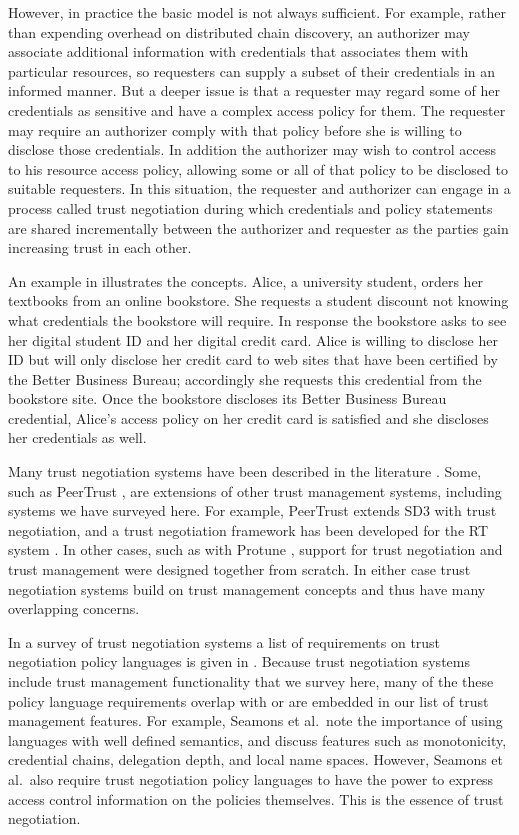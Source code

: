 However, in practice the basic model is not always sufficient.  For
example, rather than expending overhead on distributed chain
discovery, an authorizer may associate additional information with
credentials that associates them with particular resources, so
requesters can supply a subset of their credentials in an informed
manner.  But a deeper issue is that a requester may regard some of her
credentials as sensitive and have a complex access policy for
them. The requester may require an authorizer comply with that policy
before she is willing to disclose those credentials.  In addition the
authorizer may wish to control access to his resource access policy,
allowing some or all of that policy to be disclosed to suitable
requesters. In this situation, the requester and authorizer can engage
in a process called trust negotiation during which
credentials and policy statements are shared incrementally between the
authorizer and requester as the parties gain increasing trust in each
other.

An example in \cite{seamons-policy02} illustrates the concepts. Alice, a
university student, orders her textbooks from an online bookstore. She
requests a student discount not knowing what credentials the bookstore will
require. In response the bookstore asks to see her digital student ID and her
digital credit card. Alice is willing to disclose her ID but will only
disclose her credit card to web sites that have been certified by the Better
Business Bureau; accordingly she requests this credential from the bookstore
site. Once the bookstore discloses its Better Business Bureau credential,
Alice's access policy on her credit card is satisfied and she discloses her
credentials as well.

Many trust negotiation systems have been described in the literature
\cite{Winslett:NTW,gavriloaie-eswp04,protune-05}. Some, such as
PeerTrust \cite{gavriloaie-eswp04}, are extensions of other trust
management systems, including systems we have surveyed here.  For
example, PeerTrust extends SD3 with trust negotiation, and a trust
negotiation framework has been developed for the RT system
\cite{Winsborough:TPATN}. In other cases, such as with Protune
\cite{protune-05}, support for trust negotiation and trust management
were designed together from scratch. In either case trust negotiation
systems build on trust management concepts and thus have many
overlapping concerns.

In a survey of trust negotiation systems a list of requirements on
trust negotiation policy languages is given in
\cite{seamons-policy02}. Because trust negotiation systems include
trust management functionality that we survey here, many of the these
policy language requirements overlap with or are embedded in our list
of trust management features. For example, Seamons et al.\ note the
importance of using languages with well defined semantics, and discuss
features such as monotonicity, credential chains, delegation depth,
and local name spaces.  However, Seamons et al.\ also require trust
negotiation policy languages to have the power to express access
control information on the policies themselves. This is the essence of
trust negotiation.

